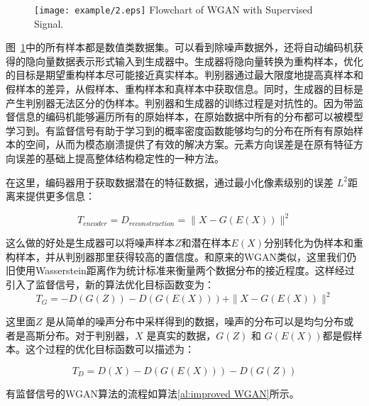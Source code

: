 \begin{figure}[htbp]
	\centering
	\texttt{[image: example/2.eps]}
	{Flowchart of WGAN with Supervised Signal.}
	\label{fig2}
\end{figure}

图~\ref{fig2}中的所有样本都是数值类数据集。可以看到除噪声数据外，还将自动编码机获得的隐向量数据表示形式输入到生成器中。生成器将隐向量转换为重构样本，优化的目标是期望重构样本尽可能接近真实样本。判别器通过最大限度地提高真样本和假样本的差异，从假样本、重构样本和真样本中获取信息。同时，生成器的目标是产生判别器无法区分的伪样本。判别器和生成器的训练过程是对抗性的。因为带监督信息的编码机能够遍历所有的原始样本，在原始数据中所有的分布都可以被模型学习到。有监督信号有助于学习到的概率密度函数能够均匀的分布在所有有原始样本的空间，从而为模态崩溃提供了有效的解决方案。元素方向误差是在原有特征方向误差的基础上提高整体结构稳定性的一种方法。

在这里，编码器用于获取数据潜在的特征数据，通过最小化像素级别的误差 $ L ^ { 2 } $距离来提供更多信息：

\begin{equation}
\label{eq11}
T_{encoder} = D_{reconstruction}=\parallel X-G(E(X))\parallel^{2}
\end{equation}

这么做的好处是生成器可以将噪声样本$Z$和潜在样本$E(X)$分别转化为伪样本和重构样本，并从判别器那里获得较高的置信度。和原来的WGAN类似，这里我们仍旧使用Wasserstein距离作为统计标准来衡量两个数据分布的接近程度。这样经过引入了监督信号，新的算法优化目标函数变为：
\begin{equation}
\label{eq:12}
T_{G} = -D(G(Z))-D(G(E(X)))+\parallel X-G(E(X))\parallel^{2}
\end{equation}

这里面$Z$ 是从简单的噪声分布中采样得到的数据，噪声的分布可以是均匀分布或者是高斯分布。对于判别器，$X$ 是真实的数据，$G(Z)$ 和 $G(E(X))$都是假样本。这个过程的优化目标函数可以描述为：

\begin{equation}
\label{eq12}
T_{D} = D(X)-D(G(E(X)))-D(G(Z))
\end{equation}

有监督信号的WGAN算法的流程如算法\ref{al:improved WGAN}所示。

